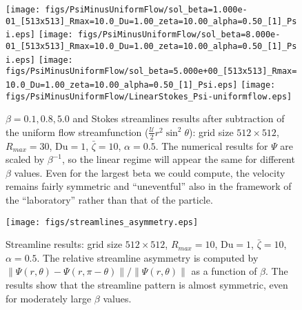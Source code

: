 \documentclass[preprint,10pt]{elsarticle}
\newcommand\Du{\text{Du}}
\newcommand\cU{\mathscr{U}}
\begin{document}
\begin{figure}
    \begin{center}
    \texttt{[image: figs/PsiMinusUniformFlow/sol\_beta=1.000e-01\_[513x513]\_Rmax=10.0\_Du=1.00\_zeta=10.00\_alpha=0.50\_[1]\_Psi.eps]}
    \texttt{[image: figs/PsiMinusUniformFlow/sol\_beta=8.000e-01\_[513x513]\_Rmax=10.0\_Du=1.00\_zeta=10.00\_alpha=0.50\_[1]\_Psi.eps]}
    \texttt{[image: figs/PsiMinusUniformFlow/sol\_beta=5.000e+00\_[513x513]\_Rmax=10.0\_Du=1.00\_zeta=10.00\_alpha=0.50\_[1]\_Psi.eps]}
    \texttt{[image: figs/PsiMinusUniformFlow/LinearStokes\_Psi-uniformflow.eps]}
        \caption[Streamfunction results]
        {$\beta = 0.1, 0.8, 5.0$ and Stokes streamlines results after subtraction of the uniform
        flow streamfunction ($\frac{\cU}{2}r^2 \sin^2\theta$): grid size $512 \times 512$, 
        $R_{max} = 30$, $\Du = 1$, $\bar\zeta = 10$, $\alpha = 0.5$.
        The numerical results for $\Psi$ are scaled by $\beta^{-1}$, so the linear regime
        will appear the same for different $\beta$ values.
        Even for the largest beta we could compute, the velocity remains fairly symmetric and 		
        ``uneventful'' also in the framework of the ``laboratory'' rather than that of the particle.}
	    \label{fig:LargeBeta_PsiMinusUniformFlow}	    
    \end{center}
\end{figure}

\begin{figure}
    \begin{center}
    \texttt{[image: figs/streamlines\_asymmetry.eps]}
        \caption[Streamfunction asymmetry]
        {Streamline results: grid size $512 \times 512$, 
        $R_{max} = 10$, $\Du = 1$, $\bar\zeta = 10$, $\alpha = 0.5$.
        The relative streamline asymmetry is computed by 
        $\|\Psi(r, \theta) - \Psi(r, \pi-\theta)\|/\|\Psi(r, \theta)\|$
        as a function of $\beta$. The results show that the streamline pattern is almost 
        symmetric, even for moderately large $\beta$ values.}
	    \label{fig:LargeBeta_PsiAsymm}	    
    \end{center}
\end{figure}
\end{document}
